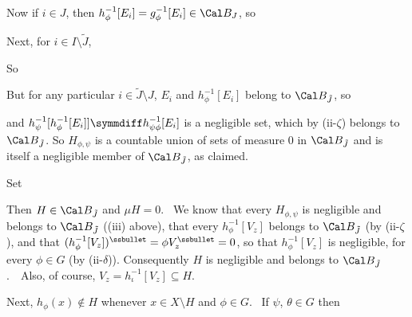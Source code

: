 {\noindent Now if $i\in J$, then $h_{\phi}^{-1}[E_i]
=g_{\phi}^{-1}[E_i]\in\Cal B_J$, so


\noindent Next, for $i\in I\setminus\tilde J$,


\noindent So


\noindent But for any particular $i\in\tilde J\setminus J$,
$E_i$ and $h_{\phi}^{-1}[E_i]$ belong to $\Cal B_{\tilde J}$, so


\noindent and $h_{\psi}^{-1}[h_{\phi}^{-1}[E_i]]\symmdiff
h_{\psi\phi}^{-1}[E_i]$ is a negligible set, which by (ii-$\zeta$)
belongs to $\Cal B_{\tilde J}$.   So
$H_{\phi,\psi}$ is a countable union of sets of measure $0$ in
$\Cal B_{\tilde J}$ and is itself a negligible member of $\Cal B_{\tilde
J}$, as claimed.\ \Qed

\medskip

 Set


\noindent Then $H\in\Cal B_{\tilde J}$ and $\mu H=0$.   \Prf\  We
know that every $H_{\phi,\psi}$ is negligible and belongs to
$\Cal B_{\tilde J}$ ((iii) above), that every $h_{\phi}^{-1}[V_z]$
belongs to $\Cal B_{\tilde J}$ (by (ii-$\zeta$), and that
$(h_{\phi}^{-1}[V_z])^{\ssbullet}=\phi V_z^{\ssbullet}=0$, so that
$h_{\phi}^{-1}[V_z]$ is negligible, for every $\phi\in G$
(by (ii-$\delta$)).   Consequently $H$ is negligible and belongs to
$\Cal B_{\tilde J}$.\ \Qed\
Also, of course, $V_z=h_{\iota}^{-1}[V_z]\subseteq H$.

Next, $h_{\phi}(x)\notin H$ whenever $x\in X\setminus H$ and $\phi\in
G$.   \Prf\ If $\psi$, $\theta\in G$ then


}
